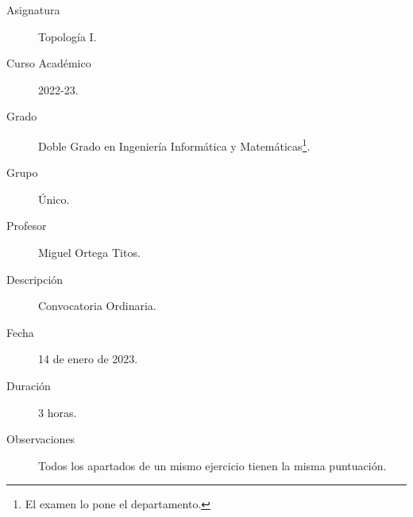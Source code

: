 \documentclass[12pt]{article}
\begin{document}

    
    

    \begin{description}
        \item[Asignatura] Topología I.
        \item[Curso Académico] 2022-23.
        \item[Grado] Doble Grado en Ingeniería Informática y Matemáticas\footnote{El examen lo pone el departamento.}.
        \item[Grupo] Único.
        \item[Profesor] Miguel Ortega Titos.
        \item[Descripción] Convocatoria Ordinaria.
        \item[Fecha] 14 de enero de 2023.
        \item[Duración] 3 horas.
        \item[Observaciones] Todos los apartados de un mismo ejercicio tienen la misma puntuación.
    
    \end{description}
    \newpage
    
\end{document}
